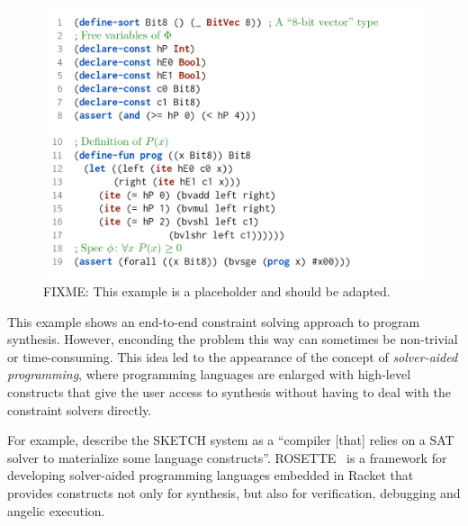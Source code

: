 \begin{figure}[h!]
  \centering
  \includegraphics[width=\textwidth]{assets/constraint-solving-smtlib.png}
  \caption{FIXME: This example is a placeholder and should be adapted.}
\end{figure}

This example shows an end-to-end constraint solving approach to program
synthesis. However, enconding the problem this way can sometimes be non-trivial
or time-consuming. This idea led to the appearance of the concept of
\textit{solver-aided programming}, where programming languages are enlarged with
high-level constructs that give the user access to synthesis without having to
deal with the constraint solvers directly.

For example, \citeauthor{Gulwani2017} describe the SKETCH system as a ``compiler
[that] relies on a SAT solver to materialize some language constructs''.
ROSETTE~\cite{Torlak:2013:GSL} is a framework for developing solver-aided
programming languages embedded in Racket that provides constructs not only for
synthesis, but also for verification, debugging and angelic execution.
